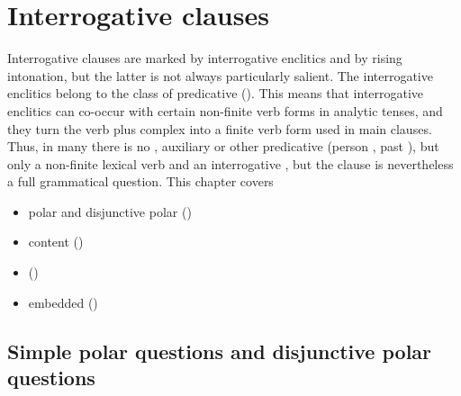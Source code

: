 \chapter{Interrogative clauses}
\label{cpt:Interrogative clauses}

Interrogative clauses are marked by interrogative enclitics and by rising intonation, but the latter is not always particularly salient. The interrogative enclitics belong to the class of predicative  (). This means that interrogative enclitics can co-occur with certain non-finite verb forms in analytic tenses, and they turn the verb plus  complex into a finite verb form used in main clauses. Thus, in many  there is no , auxiliary or other predicative  (person , past ), but only a non-finite lexical verb and an interrogative , but the clause is nevertheless a full grammatical question. This chapter covers
%
\begin{itemize}
	\item	polar  and disjunctive polar  ()
	\item	content  ()
	\item	{} ()
	\item	embedded  ()
\end{itemize}



\section{Simple polar questions and disjunctive polar questions}
\label{sec:Simple polar questions and disjunctive polar questions}

